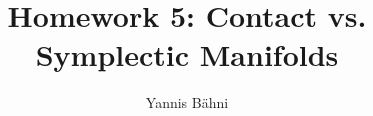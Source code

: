 

\title{Homework 5: Contact vs. Symplectic Manifolds}
\author{Yannis B\"ahni}
\address[Yannis B\"ahni]{University of Zurich, R\"amistrasse 71, 8006 Zurich}



\maketitle
\thispagestyle{fancy}
\setcounter{section}{1}

\begin{exercise}
\end{exercise}

\begin{solution}

\end{solution}

